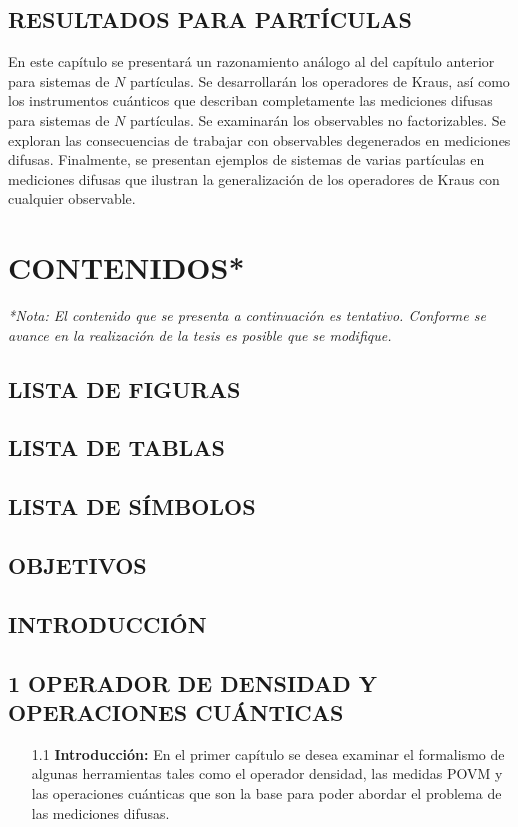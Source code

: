 \documentclass[12pt,oneside]{book}\raggedbottom{} %
\begin{document}
\begin{sloppypar}
{{\section{RESULTADOS PARA \texorpdfstring{}{N} PARTÍCULAS}

En este capítulo se presentará un razonamiento análogo al del capítulo
anterior para sistemas de $N$ partículas. Se  desarrollarán los operadores de
Kraus, así como los instrumentos cuánticos que describan completamente las
mediciones difusas para sistemas de $N$ partículas. Se examinarán los
observables no factorizables. Se exploran las consecuencias de trabajar con
observables degenerados en mediciones difusas.  Finalmente, se presentan
ejemplos de sistemas de varias partículas en mediciones difusas que ilustran la
generalización de los operadores de Kraus con cualquier observable.  

\chapter{CONTENIDOS*} %
\textit{*Nota: El contenido que se presenta a continuación es tentativo. Conforme se avance en la realización de la tesis es posible que se modifique.}


\section*{LISTA DE FIGURAS}

\section*{LISTA DE TABLAS}

\section*{LISTA DE SÍMBOLOS}

\section*{OBJETIVOS}

\section*{INTRODUCCIÓN}

\section*{1 OPERADOR DE DENSIDAD Y OPERACIONES CUÁNTICAS}
\begin{itemize}
\item[1.1]\textbf{Introducción:}
En el primer capítulo se desea examinar el formalismo de algunas herramientas tales como el operador densidad, las medidas POVM y las operaciones  cuánticas que son la base para poder abordar el problema de las mediciones difusas. 


\end{itemize}}}
\end{sloppypar}
\end{document}
